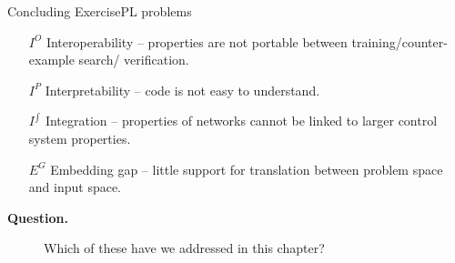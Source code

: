\documentclass[t,compress,aspectratio=169]{beamer}
\newcommand{\question}[1]{\begin{description}
		\item[\textbf{Question.}] #1
\end{description}}
\begin{document}
\begin{frame}{Concluding Exercise}{PL problems}


\begin{itemize}
\item[$I^O$] Interoperability -- properties are not portable between training/counter-example search/ verification.

\item[$I^{P}$] Interpretability -- code is not easy to understand.

\item[$I^{\int}$] Integration -- properties of networks cannot be linked to larger control system properties.

\item[$E^G$] Embedding gap -- little support for translation between problem space  and input space.
\end{itemize}

\question{Which of these have we addressed in this chapter?}
\end{frame}
\end{document}
